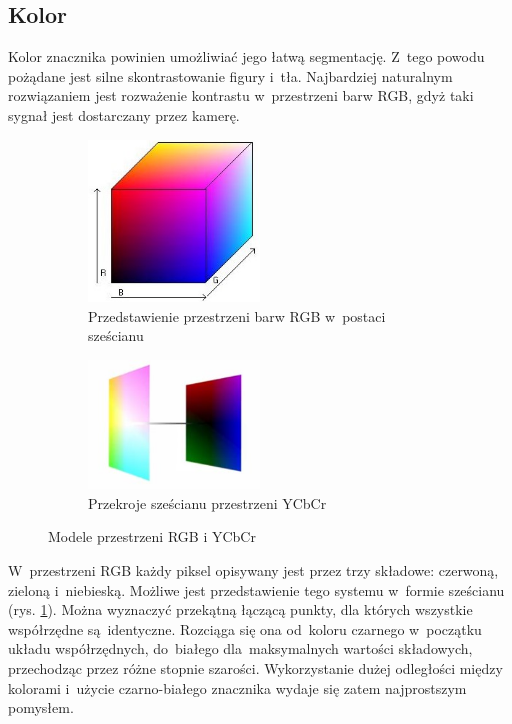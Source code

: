 \subsection{Kolor}
\label{subsec:kolor}

Kolor znacznika powinien umożliwiać jego łatwą segmentację. 
Z~tego powodu pożądane jest silne skontrastowanie figury i~tła. 
Najbardziej naturalnym rozwiązaniem jest rozważenie kontrastu w~przestrzeni barw RGB, gdyż taki sygnał jest dostarczany przez kamerę.

\begin{figure}[h]
	\centering
	\begin{subfigure}{0.4\textwidth}
		\centering
		\includegraphics[width=0.5\textwidth]{szescian_rgb.jpg}
		\caption{Przedstawienie przestrzeni barw RGB w~postaci sześcianu \cite{obrazek_rgb}}
		\label{fig:szescian_rgb}
	\end{subfigure}%
	\begin{subfigure}{0.4\textwidth}
		\centering
		\includegraphics[width=0.5\textwidth]{szescian_ycbcr.jpg}
		\caption{Przekroje sześcianu przestrzeni YCbCr \cite{obrazek_ycbcr}}
		\label{fig:szescian_ycbcr}
	\end{subfigure}%
	\caption{Modele przestrzeni RGB i YCbCr}
	\label{fig:modele_przestrzeni}
\end{figure}

W~przestrzeni RGB każdy piksel opisywany jest przez trzy składowe: czerwoną, zieloną i~niebieską. 
Możliwe jest przedstawienie tego systemu w~formie sześcianu (rys. \ref{fig:szescian_rgb}). 
Można wyznaczyć przekątną łączącą punkty, dla których wszystkie współrzędne są~identyczne. 
Rozciąga się ona od~koloru czarnego w~początku układu współrzędnych, do~białego dla~maksymalnych wartości składowych, przechodząc przez różne stopnie szarości. 
Wykorzystanie dużej odległości między kolorami i~użycie czarno-białego znacznika wydaje się zatem najprostszym pomysłem.

